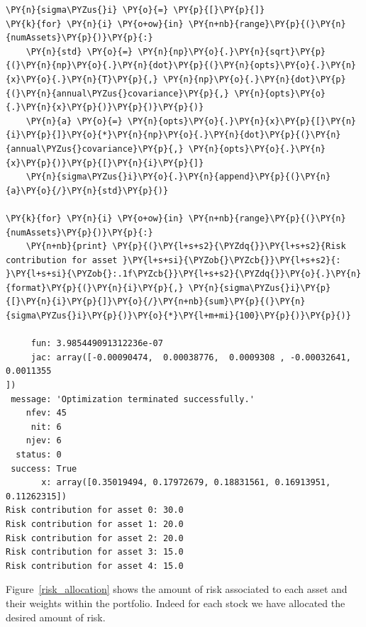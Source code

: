 \begin{tcolorbox}[breakable, size=fbox, boxrule=1pt, pad at break*=1mm,colback=cellbackground, colframe=cellborder]
\begin{Verbatim}[commandchars=\\\{\}]
\PY{n}{sigma\PYZus{}i} \PY{o}{=} \PY{p}{[}\PY{p}{]}
\PY{k}{for} \PY{n}{i} \PY{o+ow}{in} \PY{n+nb}{range}\PY{p}{(}\PY{n}{numAssets}\PY{p}{)}\PY{p}{:}
    \PY{n}{std} \PY{o}{=} \PY{n}{np}\PY{o}{.}\PY{n}{sqrt}\PY{p}{(}\PY{n}{np}\PY{o}{.}\PY{n}{dot}\PY{p}{(}\PY{n}{opts}\PY{o}{.}\PY{n}{x}\PY{o}{.}\PY{n}{T}\PY{p}{,} \PY{n}{np}\PY{o}{.}\PY{n}{dot}\PY{p}{(}\PY{n}{annual\PYZus{}covariance}\PY{p}{,} \PY{n}{opts}\PY{o}{.}\PY{n}{x}\PY{p}{)}\PY{p}{)}\PY{p}{)}
    \PY{n}{a} \PY{o}{=} \PY{n}{opts}\PY{o}{.}\PY{n}{x}\PY{p}{[}\PY{n}{i}\PY{p}{]}\PY{o}{*}\PY{n}{np}\PY{o}{.}\PY{n}{dot}\PY{p}{(}\PY{n}{annual\PYZus{}covariance}\PY{p}{,} \PY{n}{opts}\PY{o}{.}\PY{n}{x}\PY{p}{)}\PY{p}{[}\PY{n}{i}\PY{p}{]}
    \PY{n}{sigma\PYZus{}i}\PY{o}{.}\PY{n}{append}\PY{p}{(}\PY{n}{a}\PY{o}{/}\PY{n}{std}\PY{p}{)}

\PY{k}{for} \PY{n}{i} \PY{o+ow}{in} \PY{n+nb}{range}\PY{p}{(}\PY{n}{numAssets}\PY{p}{)}\PY{p}{:}
    \PY{n+nb}{print} \PY{p}{(}\PY{l+s+s2}{\PYZdq{}}\PY{l+s+s2}{Risk contribution for asset }\PY{l+s+si}{\PYZob{}\PYZcb{}}\PY{l+s+s2}{: }\PY{l+s+si}{\PYZob{}:.1f\PYZcb{}}\PY{l+s+s2}{\PYZdq{}}\PY{o}{.}\PY{n}{format}\PY{p}{(}\PY{n}{i}\PY{p}{,} \PY{n}{sigma\PYZus{}i}\PY{p}{[}\PY{n}{i}\PY{p}{]}\PY{o}{/}\PY{n+nb}{sum}\PY{p}{(}\PY{n}{sigma\PYZus{}i}\PY{p}{)}\PY{o}{*}\PY{l+m+mi}{100}\PY{p}{)}\PY{p}{)}

     fun: 3.985449091312236e-07
     jac: array([-0.00090474,  0.00038776,  0.0009308 , -0.00032641,  0.0011355
])
 message: 'Optimization terminated successfully.'
    nfev: 45
     nit: 6
    njev: 6
  status: 0
 success: True
       x: array([0.35019494, 0.17972679, 0.18831561, 0.16913951, 0.11262315])
Risk contribution for asset 0: 30.0
Risk contribution for asset 1: 20.0
Risk contribution for asset 2: 20.0
Risk contribution for asset 3: 15.0
Risk contribution for asset 4: 15.0
    \end{Verbatim}
\end{tcolorbox}
Figure~\ref{risk_allocation} shows the amount of risk associated to each asset and their weights within the portfolio. Indeed for each stock we have allocated the desired amount of risk.

